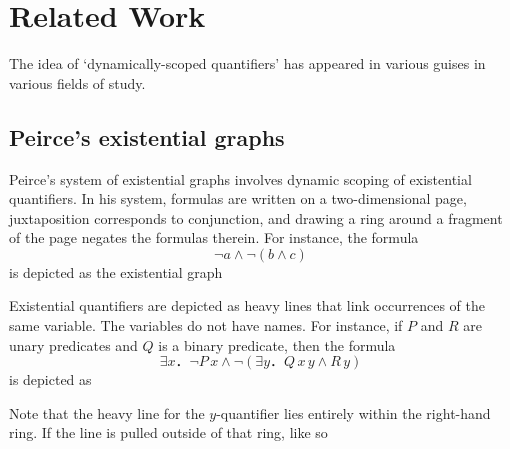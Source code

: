 \documentclass[svgnames]{llncs}
\begin{document}
\clearpage

\section{Related Work}\label{sect:related}

The idea of `dynamically-scoped quantifiers' has appeared in various guises in various fields of study.

\subsection{Peirce's existential graphs}

Peirce's system of existential graphs \cite{hammer98,peirce03} involves dynamic scoping of existential quantifiers. In his system, formulas are written on a two-dimensional page, juxtaposition corresponds to conjunction, and drawing a ring around a fragment of the page negates the formulas therein. For instance, the formula \[¬a ∧ ¬(b ∧ c)\] is depicted as the existential graph
\begin{center}
\end{center}
Existential quantifiers are depicted as heavy lines that link occurrences of the same variable. The variables do not have names. For instance, if $P$ and $R$ are unary predicates and $Q$ is a binary predicate, then the formula \[∃x．¬P\,x ∧ ¬ (∃y．Q\,x\,y ∧ R\,y)\] is depicted as
\begin{center}
\end{center}
Note that the heavy line for the $y$-quantifier lies entirely within the right-hand ring. If the line is pulled outside of that ring, like so 
\begin{center}
\end{center}
\end{document}
